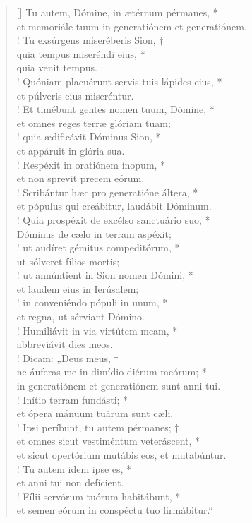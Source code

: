 \begin{verse}[\versewidth]
Tu autem, Dómine, in ætérnum pérmanes, *\\
et memoriále tuum in generatiónem et generatiónem.\\!
\vin Tu exsúrgens miseréberis Sion, †\\
\vin quia tempus miseréndi eius, *\\
\vin quia venit tempus.\\!
Quóniam placuérunt servis tuis lápides eius, *\\
et púlveris eius miseréntur.\\!
\vin Et timébunt gentes nomen tuum, Dómine, *\\
\vin et omnes reges terræ glóriam tuam;\\!
quia ædificávit Dóminus Sion, *\\
et appáruit in glória sua.\\!
\vin Respéxit in oratiónem ínopum, *\\
\vin et non sprevit precem eórum.\\!
Scribántur hæc pro generatióne áltera, *\\
et pópulus qui creábitur, laudábit Dóminum.\\!
\vin Quia prospéxit de excélso sanctuário suo, *\\
\vin Dóminus de cælo in terram aspéxit;\\!
ut audíret gémitus compeditórum, *\\
ut sólveret fílios mortis;\\!
\vin ut annúntient in Sion nomen Dómini, *\\
\vin et laudem eius in Ierúsalem;\\!
in conveniéndo pópuli in unum, *\\
et regna, ut sérviant Dómino.\\!
\vin Humiliávit in via virtútem meam, *\\
\vin abbreviávit dies meos.\\!
Dicam: „Deus meus, †\\
ne áuferas me in dimídio diérum meórum; *\\
in generatiónem et generatiónem sunt anni tui.\\!
\vin Inítio terram fundásti; *\\
\vin et ópera mánuum tuárum sunt cæli.\\!
Ipsi períbunt, tu autem pérmanes; †\\
et omnes sicut vestiméntum veteráscent, *\\
et sicut opertórium mutábis eos, et mutabúntur.\\!
\vin Tu autem idem ipse es, *\\
\vin et anni tui non defícient.\\!
Fílii servórum tuórum habitábunt, *\\
et semen eórum in conspéctu tuo firmábitur.“\\
\end{verse}
\vspace{1cm}


